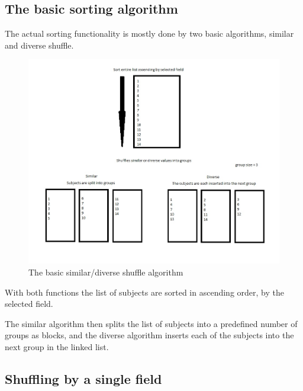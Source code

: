 \subsection{The basic sorting algorithm}\par

The actual sorting functionality is mostly done by two basic algorithms, similar and diverse shuffle.\par

 \begin{figure}[H] 
	\centering
	\includegraphics[width=12cm]{./graphics/basicAlgorithm.jpg}\par
	\caption{The basic similar/diverse shuffle algorithm}
\end{figure}
With both functions the list of subjects are sorted in ascending order, by the selected field.

The similar algorithm then splits the list of subjects into a predefined number of groups as blocks, and the diverse algorithm inserts each of the subjects into the next group in the linked list. 



\subsection{Shuffling by a single field}\par

